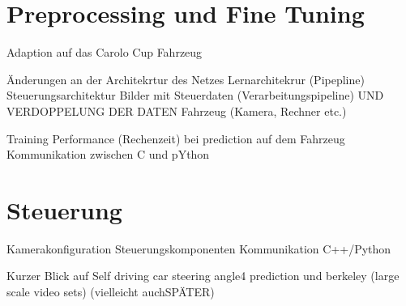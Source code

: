 \section{Preprocessing und Fine Tuning}


Adaption auf das Carolo Cup Fahrzeug






Änderungen an der Architekrtur des Netzes
Lernarchitekrur (Pipepline)
Steuerungsarchitektur
Bilder mit Steuerdaten (Verarbeitungspipeline) UND VERDOPPELUNG DER DATEN
Fahrzeug (Kamera, Rechner etc.)

Training 
Performance (Rechenzeit) bei prediction auf dem Fahrzeug
Kommunikation zwischen C und pYthon


\section{Steuerung}

Kamerakonfiguration
Steuerungskomponenten
Kommunikation C++/Python



Kurzer Blick auf  Self driving car steering angle4 prediction und berkeley (large scale video sets) (vielleicht auchSPÄTER)


